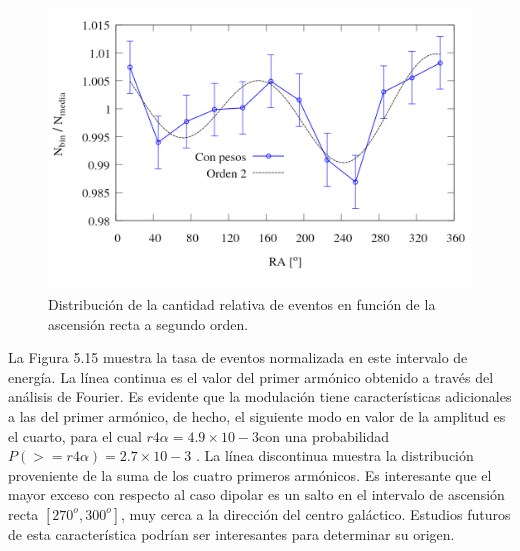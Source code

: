 	\begin{figure}[H]
		\centering
		\includegraphics[width=0.75\linewidth]{eventos_clasificados_por_RA_v6_orden_2.png}
		\caption{Distribución de la cantidad relativa de eventos en función de la ascensión recta a segundo orden.}
	\end{figure}


La Figura 5.15 muestra la tasa de eventos normalizada en este intervalo de energía.
La línea continua es el valor del primer armónico obtenido a través del análisis de
Fourier. Es evidente que la modulación tiene características adicionales a las del primer
armónico, de hecho, el siguiente modo en valor de la amplitud es el cuarto, para el cual
$r 4 \alpha = 4.9 \times 10 -3 $con una probabilidad $P (>= r 4 \alpha ) = 2.7 \times 10 -3$ . La línea discontinua
muestra la distribución proveniente de la suma de los cuatro primeros armónicos. Es
interesante que el mayor exceso con respecto al caso dipolar es un salto en el intervalo
de ascensión recta $[ 270 ^o , 300 ^o ]$, muy cerca a la dirección del centro galáctico. Estudios
futuros de esta característica podrían ser interesantes para determinar su origen.








